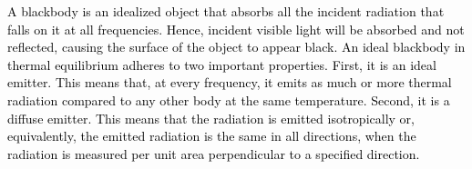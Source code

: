 \documentclass[main.tex]{subfiles}
\begin{document}






\begin{tcolorbox}[sharp corners, colback=blue!30, colframe=blue!80!blue, title=Box \refstepcounter{educhap1}\label{boxchap1:bb}\ref{boxchap1:bb} -- Blackbody]
\par \textcolor{black} {A blackbody is an idealized object that absorbs all the incident radiation that falls on it at all frequencies.  Hence, incident visible light will be absorbed and not reflected, causing the surface of the object to appear black.  An ideal blackbody in thermal equilibrium adheres to two important properties.  First, it is an ideal emitter.  This means that, at every frequency, it emits as much or more thermal radiation compared to any other body at the same temperature.  Second, it is a diffuse emitter.  This means that the radiation is emitted isotropically or, equivalently, the emitted radiation is the same in all directions, when the radiation is measured per unit area perpendicular to a specified direction.}
\end{tcolorbox}
\end{document}

